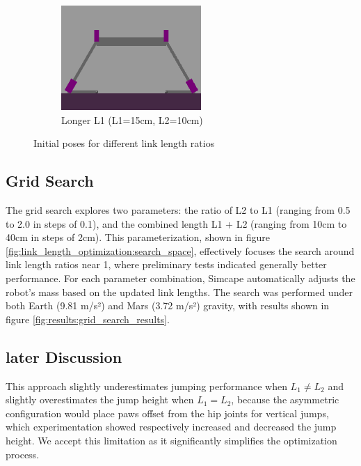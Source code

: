 \begin{figure}[h]
\begin{subfigure}[b]{0.32\textwidth}
        \centering
        \includegraphics[width=\textwidth]{Images/link_length_optimization/longer_L1_pose.png}
        \caption{Longer L1 (L1=15cm, L2=10cm)}
    \end{subfigure}
    \caption{Initial poses for different link length ratios}
    \label{fig:link_length_optimization:initial_poses}
\end{figure}



\subsection{Grid Search}
The grid search explores two parameters: the ratio of L2 to L1 (ranging from 0.5 to 2.0 in steps of 0.1), and the combined length L1 + L2 (ranging from 10cm to 40cm in steps of 2cm). This parameterization, shown in figure \ref{fig:link_length_optimization:search_space}, effectively focuses the search around link length ratios near 1, where preliminary tests indicated generally better performance. For each parameter combination, Simcape automatically adjusts the robot's mass based on the updated link lengths. The search was performed under both Earth (9.81 m/s²) and Mars (3.72 m/s²) gravity, with results shown in figure \ref{fig:results:grid_search_results}.



\subsection{later Discussion}
This approach slightly underestimates jumping performance when \(L_1 \neq L_2\) and slightly overestimates the jump height when \(L_1 = L_2\), because the asymmetric configuration would place paws offset from the hip joints for vertical jumps, which experimentation showed respectively increased and decreased the jump height. We accept this limitation as it significantly simplifies the optimization process.
